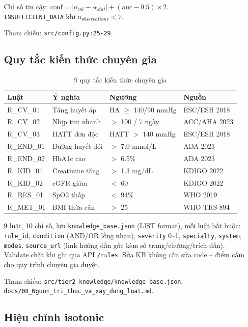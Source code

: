\documentclass[13pt,a4paper]{article}
\begin{document}
Chỉ số tin cậy: $\text{conf} = |\alpha_{ml} - \alpha_{stat}| + (\text{auc} - 0.5) \times 2$. \\
\texttt{INSUFFICIENT\_DATA} khi $n_{observations} < 7$.

Tham chiếu: \texttt{src/config.py:25-29}.

\subsection{Quy tắc kiến thức chuyên gia}

\begin{table}[H]
\centering
\caption{9 quy tắc kiến thức chuyên gia}
\label{tab:rules}
\begin{tabular}{llll}
\toprule
Luật & Ý nghĩa & Ngưỡng & Nguồn \\
\midrule
R\_CV\_01 & Tăng huyết áp & HA $\ge$ 140/90 mmHg & ESC/ESH 2018 \\
R\_CV\_02 & Nhịp tim nhanh & $>$ 100 / 7 ngày & ACC/AHA 2023 \\
R\_CV\_03 & HATT đơn độc & HATT $>$ 140 mmHg & ESC/ESH 2018 \\
R\_END\_01 & Đường huyết đói & $>$ 7.0 mmol/L & ADA 2023 \\
R\_END\_02 & HbA1c cao & $>$ 6.5\% & ADA 2023 \\
R\_KID\_01 & Creatinine tăng & $>$ 1.3 mg/dL & KDIGO 2022 \\
R\_KID\_02 & eGFR giảm & $<$ 60 & KDIGO 2022 \\
R\_RES\_01 & SpO2 thấp & $<$ 94\% & WHO 2019 \\
R\_MET\_01 & BMI thừa cân & $>$ 25 & WHO TRS 894 \\
\bottomrule
\end{tabular}
\end{table}

9 luật, 10 chỉ số, lưu \texttt{knowledge\_base.json} (LIST format), mỗi luật bắt buộc: \texttt{rule\_id}, \texttt{condition} (AND/OR lồng nhau), \texttt{severity} 0--1, \texttt{specialty}, \texttt{system}, \texttt{modes}, \texttt{source\_url} (link hướng dẫn gốc kèm số trang/chương/trích dẫn). Validate chặt khi ghi qua API \texttt{/rules}. Sửa KB không cần sửa code -- điểm cắm cho quy trình chuyên gia duyệt.

Tham chiếu: \texttt{src/tier2\_knowledge/knowledge\_base.json}, \texttt{docs/08\_Nguon\_tri\_thuc\_va\_xay\_dung\_luat.md}.

\subsection{Hiệu chỉnh isotonic}
\end{document}

